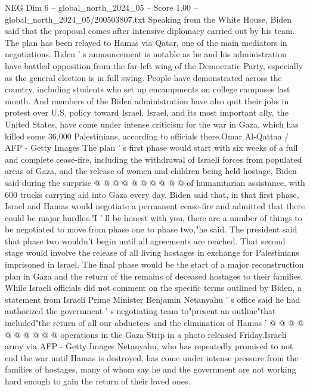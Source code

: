 \begin{textsample}{NEG Dim 6 – global\_north\_2024\_05 – Score 1.00 – global\_north\_2024\_05/200503807.txt}  \label{ex:f6_neg_301}
Speaking from the White House, Biden said that the proposal comes after intensive diplomacy carried out by his team.
The plan has been relayed to Hamas via Qatar, one of the main mediators in negotiations.
Biden ' s announcement is notable as he and his administration have battled opposition from the far-left wing of the Democratic Party, especially as the general election is in full swing.
People have demonstrated across the country, including students who set up encampments on college campuses last month.
And members of the Biden administration have also quit their jobs in protest over U.S. policy toward Israel.
Israel, and its most important ally, the United States, have come under intense criticism for the war in Gaza, which has killed some 36,000 Palestinians, according to officials there.Omar Al-Qattaa / AFP - Getty Images The plan ' s first phase would start with six weeks of a full and complete cease-fire, including the withdrawal of Israeli forces from populated areas of Gaza, and the release of women and children being held hostage, Biden said during the surprise @ @ @ @ @ @ @ @ @ @ of humanitarian assistance, with 600 trucks carrying aid into Gaza every day.
Biden said that, in that first phase, Israel and Hamas would negotiate a permanent cease-fire and admitted that there could be major hurdles."I ' ll be honest with you, there are a number of things to be negotiated to move from phase one to phase two,"he said.
The president said that phase two wouldn't begin until all agreements are reached.
That second stage would involve the release of all living hostages in exchange for Palestinians imprisoned in Israel.
The final phase would be the start of a major reconstruction plan in Gaza and the return of the remains of deceased hostages to their families.
While Israeli officials did not comment on the specific terms outlined by Biden, a statement from Israeli Prime Minister Benjamin Netanyahu ' s office said he had authorized the government ' s negotiating team to"present an outline"that included"the return of all our abductees and the elimination of Hamas ' @ @ @ @ @ @ @ @ @ @ operations in the Gaza Strip in a photo released Friday.Israeli army via AFP - Getty Images Netanyahu, who has repeatedly promised to not end the war until Hamas is destroyed, has come under intense pressure from the families of hostages, many of whom say he and the government are not working hard enough to gain the return of their loved ones.

\end{textsample}
